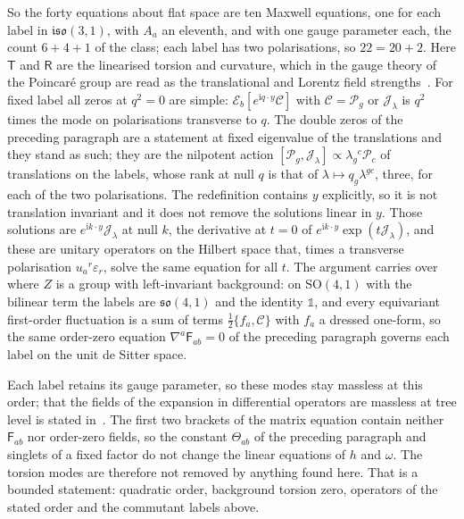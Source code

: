So the forty equations about flat space are ten Maxwell equations, one for each label in \(\mathfrak{iso}(3,1)\), with \(A_a\) an eleventh, and with one gauge parameter each, the count \(6+4+1\) of the class; each label has two polarisations, so \(22=20+2\). Here \(\mathsf T\) and \(\mathsf R\) are the linearised torsion and curvature, which in the gauge theory of the Poincar\'e group are read as the translational and Lorentz field strengths~\cite{Hehl2017}. For fixed label all zeros at \(q^2=0\) are simple: \(\mathcal E_b[e^{\mathrm iq\cdot y}\mathcal C]\) with \(\mathcal C=\mathcal P_g\) or \(\mathcal J_\lambda\) is \(q^2\) times the mode on polarisations transverse to \(q\). The double zeros of the preceding paragraph are a statement at fixed eigenvalue of the translations and they stand as such; they are the nilpotent action \([\mathcal P_g,\mathcal J_\lambda]\propto\lambda_g{}^c\mathcal P_c\) of translations on the labels, whose rank at null \(q\) is that of \(\lambda\mapsto q_g\lambda^{gc}\), three, for each of the two polarisations. The redefinition contains \(y\) explicitly, so it is not translation invariant and it does not remove the solutions linear in \(y\). Those solutions are \(e^{\mathrm ik\cdot y}\mathcal J_\lambda\) at null \(k\), the derivative at \(t=0\) of \(e^{\mathrm ik\cdot y}\exp(t\mathcal J_\lambda)\), and these are unitary operators on the Hilbert space that, times a transverse polarisation \(u_a{}^r\varepsilon_r\), solve the same equation for all \(t\). The argument carries over where \(Z\) is a group with left-invariant background: on \(\mathrm{SO}(4,1)\) with the bilinear term the labels are \(\mathfrak{so}(4,1)\) and the identity \(\mathbb 1\), and every equivariant first-order fluctuation is a sum of terms \(\tfrac12\{f_a,\mathcal C\}\) with \(f_a\) a dressed one-form, so the same order-zero equation \(\nabla^a\mathsf F_{ab}=0\) of the preceding paragraph governs each label on the unit de Sitter space.

Each label retains its gauge parameter, so these modes stay massless at this order; that the fields of the expansion in differential operators are massless at tree level is stated in~\cite{Sakai2019}. The first two brackets of the matrix equation contain neither \(\mathsf F_{ab}\) nor order-zero fields, so the constant \(\Theta_{ab}\) of the preceding paragraph and singlets of a fixed factor do not change the linear equations of \(h\) and \(\omega\). The torsion modes are therefore not removed by anything found here. That is a bounded statement: quadratic order, background torsion zero, operators of the stated order and the commutant labels above.

